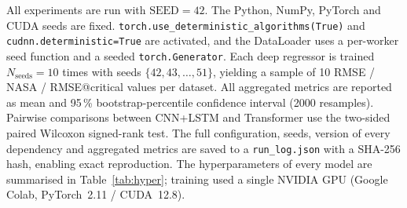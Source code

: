 \documentclass[5p,times,authoryear]{elsarticle}
\begin{document}
\begin{sloppypar}
All experiments are run with $\mathrm{SEED}{=}42$. The Python, NumPy, PyTorch and CUDA seeds are fixed. \texttt{torch.use\_deterministic\_algorithms(True)} and \texttt{cudnn.deterministic=True} are activated, and the DataLoader uses a per-worker seed function and a seeded \texttt{torch.Generator}. Each deep regressor is trained $N_{\mathrm{seeds}}{=}10$ times with seeds $\{42,43,\dots,51\}$, yielding a sample of 10 RMSE / NASA / RMSE@critical values per dataset. All aggregated metrics are reported as mean and 95\,\% bootstrap-percentile confidence interval (2000 resamples). Pairwise comparisons between CNN+LSTM and Transformer use the two-sided paired Wilcoxon signed-rank test. The full configuration, seeds, version of every dependency and aggregated metrics are saved to a \texttt{run\_log.json} with a SHA-256 hash, enabling exact reproduction. The hyperparameters of every model are summarised in Table~\ref{tab:hyper}; training used a single NVIDIA GPU (Google Colab, PyTorch~2.11 / CUDA~12.8).
\end{sloppypar}

\begin{table}[!t]
\centering
\caption{Model hyperparameters. Common to all deep models: window $w{=}30$, RUL cap $125$, batch size $256$, gradient clipping at norm $1.0$, ReduceLROnPlateau (factor $0.5$, patience $4$), MC Dropout $T{=}50$.}
\label{tab:hyper}
\small
{}
\end{table}
\end{document}
